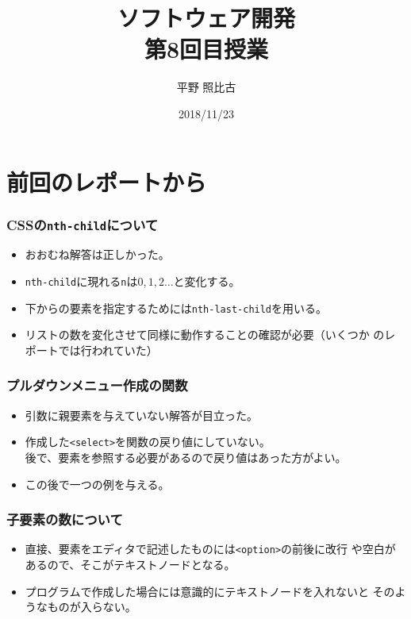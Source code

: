 
\title{ソフトウェア開発\\第8回目授業}
\author{平野 照比古}
\institute{}
\date{2018/11/23}
\newtheorem{Prob}{解説}
\newcommand{\Elm}[1]{\texttt{<#1>}}

\newcommand{\DOMM}{\texttt}
\newcommand{\Event}{\texttt}
\newcommand{\DOMP}{\texttt}
\newcommand{\DOM}{\texttt{DOM}}
\newcommand{\keyitem}{\relax}
\newcommand{\HTML}{HTML文書}

\frame{\maketitle}
\section{前回のレポートから}
 \begin{frame}[containsverbatim]
  \frametitle{CSSの\protect\texttt{nth-child}について}
  \begin{itemize}
   \item おおむね解答は正しかった。
   \item \texttt{nth-child}に現れる\texttt{n}は$0,1,2\dots$と変化する。
   \item 下からの要素を指定するためには\texttt{nth-last-child}を用いる。
	 \item リストの数を変化させて同様に動作することの確認が必要（いくつか
				 のレポートでは行われていた）
  \end{itemize}
 \end{frame}
 \begin{frame}[containsverbatim]
  \frametitle{プルダウンメニュー作成の関数}
\begin{itemize}
 \item 引数に親要素を与えていない解答が目立った。
 \item 作成した\Elm{select}を関数の戻り値にしていない。\\
       後で、要素を参照する必要があるので戻り値はあった方がよい。
 \item この後で一つの例を与える。
\end{itemize}
 \end{frame}
 \begin{frame}[containsverbatim]
   \frametitle{子要素の数について}
   \begin{itemize}
    \item 直接、要素をエディタで記述したものには\Elm{option}の前後に改行
          や空白があるので、そこがテキストノードとなる。
    \item プログラムで作成した場合には意識的にテキストノードを入れないと
          そのようなものが入らない。
   \end{itemize}
\end{frame}

